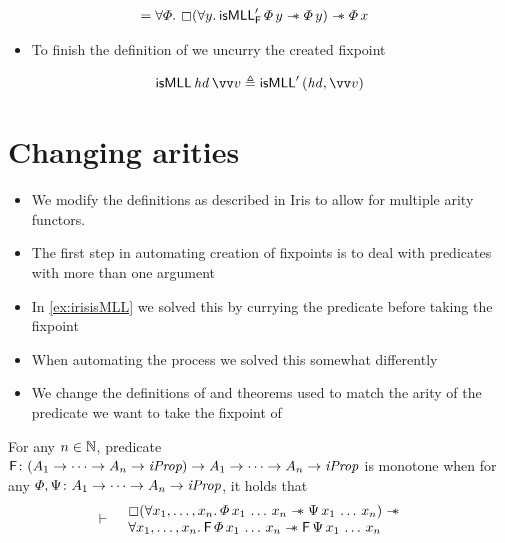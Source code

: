 \documentclass[thesis.tex]{subfiles}
\begin{document}
\begin{example}
\begin{align*}
                                     & = \All \pred. \always(\All \varB. \isMLL'_\hopred\, \pred\, \varB \wand \pred\, \varB) \wand \pred \, \var
    \end{align*}
    \begin{itemize}
        \item To finish the definition of \isMLL we uncurry the created fixpoint
    \end{itemize}
    \begin{align*}
        \isMLL\, \hd\, \vect{\val} \eqdef \isMLL'\, (\hd, \vect{\val})
    \end{align*}

\end{example}

\section{Changing arities}
\begin{itemize}
    \item We modify the definitions as described in Iris to allow for multiple arity functors.
\end{itemize}
\begin{itemize}
    \item The first step in automating creation of fixpoints is to deal with predicates with more than one argument
    \item In \cref*{ex:irisisMLL} we solved this by currying the predicate before taking the fixpoint
    \item When automating the process we solved this somewhat differently
    \item We change the definitions of and theorems used to match the arity of the predicate we want to take the fixpoint of
\end{itemize}
\begin{definition}
    For any $n\in\mathbb{N}$, predicate $\textsf{\upshape F}\colon (A_1 \to \dots \to A_n \to \textit{iProp}) \to A_1 \to \dots \to A_n \to \textit{iProp}$ is monotone when for any $\varPhi, \Psi\colon A_1 \to \dots \to A_n \to \textit{iProp}$, it holds that
    \begin{align*}
        \proves &
        \begin{array}{rl}
             & \always(\All \var_1,\dots,\var_n. \pred\,\var_1\,\dots\,\var_n \wand \predB\,\var_1\,\dots\,\var_n) \wand   \\
             & \All\var_1,\dots,\var_n. \hopred\,\pred\,\var_1\,\dots\,\var_n \wand \hopred\,\predB\,\var_1\,\dots\,\var_n
        \end{array}
    \end{align*}
\end{definition}
\end{document}
